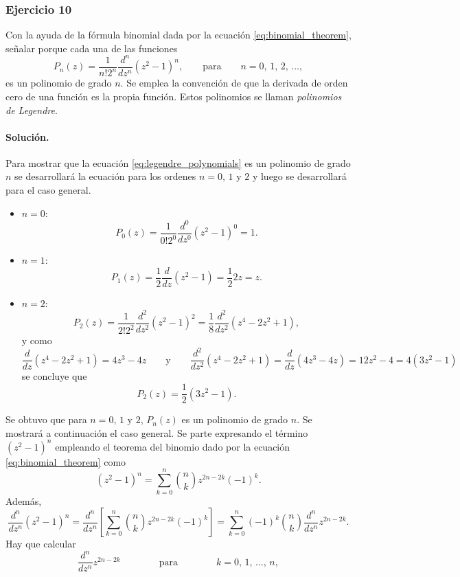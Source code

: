 \documentclass[a4paper]{report}
\begin{document}
\subsubsection{Ejercicio 10}

Con la ayuda de la fórmula binomial dada por la ecuación \ref{eq:binomial_theorem}, señalar porque cada una de las funciones 
\begin{equation}\label{eq:legendre_polynomials}
  P_n(z)=\frac{1}{n!2^n}\frac{d^n}{dz^n}(z^2-1)^n,\qquad\textrm{para}\qquad n=0,\,1,\,2,\,\dots,
\end{equation}
es un polinomio de grado \(n\). Se emplea la convención de que la derivada de orden cero de una función es la propia función. Estos polinomios se llaman \emph{polinomios de Legendre}.

\paragraph{Solución.} Para mostrar que la ecuación \ref{eq:legendre_polynomials} es un polinomio de grado \(n\) se desarrollará la ecuación para los ordenes \(n=0,\,1\) y \(2\) y luego se desarrollará para el caso general.
\begin{itemize}
 \item \(n=0\):
 \[
  P_0(z)=\frac{1}{0!2^0}\frac{d^0}{dz^0}(z^2-1)^0=1.
 \]
 \item \(n=1\):
 \[
  P_1(z)=\frac{1}{2}\frac{d}{dz}(z^2-1)=\frac{1}{2}2z=z.
 \]
 \item \(n=2\):
 \[
  P_2(z)=\frac{1}{2!2^2}\frac{d^2}{dz^2}(z^2-1)^2=\frac{1}{8}\frac{d^2}{dz^2}(z^4-2z^2+1),
 \]
 y como
 \[
  \frac{d}{dz}(z^4-2z^2+1)=4z^3-4z
  \qquad\textrm{y}\qquad
  \frac{d^2}{dz^2}(z^4-2z^2+1)=\frac{d}{dz}(4z^3-4z)=12z^2-4=4(3z^2-1)
 \]
 se concluye que 
 \[
  P_2(z)=\frac{1}{2}(3z^2-1).
 \]
\end{itemize}
Se obtuvo que para \(n=0,\,1\) y \(2\), \(P_n(z)\) es un polinomio de grado \(n\). Se mostrará a continuación el caso general. Se parte expresando el término \((z^2-1)^n\) empleando el teorema del binomio dado por la ecuación \ref{eq:binomial_theorem} como 
\[
 (z^2-1)^n=\sum_{k=0}^n\binom{n}{k}z^{2n-2k}(-1)^k.
\]
Además,
\begin{equation}\label{eq:exersice_20_10_derivative}
 \frac{d^n}{dz^n}(z^2-1)^n=\frac{d^n}{dz^n}\left[\sum_{k=0}^n\binom{n}{k}z^{2n-2k}(-1)^k\right]
 =\sum_{k=0}^n(-1)^k\binom{n}{k}\frac{d^n}{dz^n}z^{2n-2k}.
\end{equation}
Hay que calcular
\[
 \frac{d^n}{dz^n}z^{2n-2k}\qquad\qquad\textrm{para}\qquad\qquad k=0,\,1,\,\dots,\,n,
\]
\end{document}
